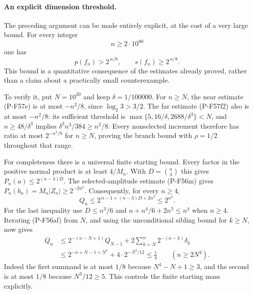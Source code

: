 \paragraph{An explicit dimension threshold.}
The preceding argument can be made entirely explicit, at the
cost of a very large bound. For every integer
\[
                   n\ge 2\cdot10^{80}
\]
one has
\[
                 p(f_n)>2^{\,n/8},
            \qquad s(f_n)\ge2^{\,n/8}.
 \tag{P-F57g1}
\]
This bound is a quantitative consequence of the estimates already
proved, rather than a claim about a practically small counterexample.

To verify it, put $N=10^{20}$ and keep
$\delta=1/100000$.
For $n\ge N$, the near estimate (P-F57e) is at most
$-n^2/8$, since $\log_2 3>3/2$.
The far estimate (P-F57f2) also is at most $-n^2/8$:
its sufficient threshold is
$\max\{5,16/\delta,2688/\delta^3\}<N$, and
$n\ge48/\delta^3$ implies
$\delta^3n^3/384\ge n^2/8$.
Every nonselected increment therefore has ratio at most
$2^{-n^2/8}$ for $n\ge N$, proving the branch bound
with $\rho=1/2$ throughout that range.

For completeness there is a universal finite starting bound.
Every factor in the positive normal product is at least
$4/M_n$. With $D=\binom n3$ this gives
$P_n(a)\le2^{(n-3)D}$.
The selected-amplitude estimate (P-F56m) gives
$P_n(b_n)=M_n|Z_n|\ge2^{-2n^3}$.
Consequently, for every $n\ge4$,
\[
 Q_n\le2^{\,n-1+(n-3)D+2n^3}\le2^{n^4}.
 \tag{P-F57g2}
\]
For the last inequality use $D\le n^3/6$ and
$n+n^4/6+2n^3\le n^4$ when $n\ge4$.
Iterating (P-F56af) from $N$, and using the unconditional
sibling bound for $k\ge N$, now gives
\[
 \begin{split}
 Q_n
 &\le2^{-(n-N+1)}Q_{N-1}
       +2\sum_{k=N}^n2^{-(n-k)}\delta_k\\
 &\le2^{-n+N-1+N^4}+4\cdot2^{-N^3/12}
                         \le\frac14
       \qquad(n\ge2N^4).
 \end{split}
 \tag{P-F57g3}
\]
Indeed the first summand is at most $1/8$ because
$N^4-N+1\ge3$, and the second is at most $1/8$
because $N^3/12\ge5$.
This controls the finite starting mass explicitly.

